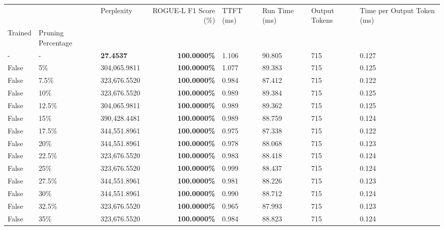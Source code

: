 \begin{table}[H]
\label{tab:evaluation-pipeline-2-untrained}
\begin{tabular}{lllrllll}
\toprule
 &  & Perplexity & ROGUE-L F1 Score (\%) & TTFT (ms) & Run Time (ms) & Output Tokens & Time per Output Token (ms) \\
Trained & Pruning Percentage &  &  &  &  &  &  \\
\midrule
- & - & \bfseries 27.4537 & \bfseries 100.0000\% & 1.106 & 90.805 & 715 & 0.127 \\
\cline{1-8} \cline{2-8}
False & 5\% & \color{red} 304,065.9811 & \bfseries \color{red} 100.0000\% & 1.077 & 89.383 & 715 & 0.125 \\
\cline{1-8} \cline{2-8}
False & 7.5\% & 323,676.5520 & \bfseries \color{red} 100.0000\% & 0.984 & 87.412 & 715 & 0.122 \\
\cline{1-8} \cline{2-8}
False & 10\% & 323,676.5520 & \bfseries \color{red} 100.0000\% & 0.989 & 89.384 & 715 & 0.125 \\
\cline{1-8} \cline{2-8}
False & 12.5\% & \color{red} 304,065.9811 & \bfseries \color{red} 100.0000\% & 0.989 & 89.362 & 715 & 0.125 \\
\cline{1-8} \cline{2-8}
False & 15\% & 390,428.4481 & \bfseries \color{red} 100.0000\% & 0.989 & 88.759 & 715 & 0.124 \\
\cline{1-8} \cline{2-8}
False & 17.5\% & 344,551.8961 & \bfseries \color{red} 100.0000\% & 0.975 & 87.338 & 715 & 0.122 \\
\cline{1-8} \cline{2-8}
False & 20\% & 344,551.8961 & \bfseries \color{red} 100.0000\% & 0.978 & 88.068 & 715 & 0.123 \\
\cline{1-8} \cline{2-8}
False & 22.5\% & 323,676.5520 & \bfseries \color{red} 100.0000\% & 0.983 & 88.418 & 715 & 0.124 \\
\cline{1-8} \cline{2-8}
False & 25\% & 323,676.5520 & \bfseries \color{red} 100.0000\% & 0.999 & 88.437 & 715 & 0.124 \\
\cline{1-8} \cline{2-8}
False & 27.5\% & 344,551.8961 & \bfseries \color{red} 100.0000\% & 0.981 & 88.226 & 715 & 0.123 \\
\cline{1-8} \cline{2-8}
False & 30\% & 344,551.8961 & \bfseries \color{red} 100.0000\% & 0.990 & 88.712 & 715 & 0.124 \\
\cline{1-8} \cline{2-8}
False & 32.5\% & 323,676.5520 & \bfseries \color{red} 100.0000\% & 0.965 & 87.993 & 715 & 0.123 \\
\cline{1-8} \cline{2-8}
False & 35\% & 323,676.5520 & \bfseries \color{red} 100.0000\% & 0.984 & 88.823 & 715 & 0.124 \\

\end{tabular}
\end{table}
